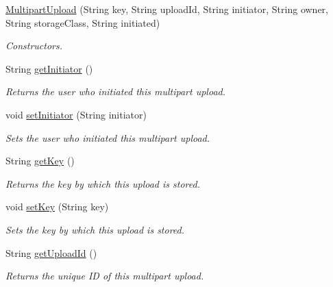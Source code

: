 \begin{DoxyCompactItemize}
\item 
\hyperlink{classorg_1_1jcs_1_1dss_1_1main_1_1MultipartUpload_a8a7ecab6fc0579709a714aed5081db57}{Multipart\+Upload} (String key, String upload\+Id, String initiator, String owner, String storage\+Class, String initiated)\hypertarget{classorg_1_1jcs_1_1dss_1_1main_1_1MultipartUpload_a8a7ecab6fc0579709a714aed5081db57}{}\label{classorg_1_1jcs_1_1dss_1_1main_1_1MultipartUpload_a8a7ecab6fc0579709a714aed5081db57}

\begin{DoxyCompactList}\small\item\em Constructors. \end{DoxyCompactList}\item 
String \hyperlink{classorg_1_1jcs_1_1dss_1_1main_1_1MultipartUpload_a2bf924f6af4a780ad4d7acdb9b15e0c8}{get\+Initiator} ()
\begin{DoxyCompactList}\small\item\em Returns the user who initiated this multipart upload. \end{DoxyCompactList}\item 
void \hyperlink{classorg_1_1jcs_1_1dss_1_1main_1_1MultipartUpload_ab753f6da2a76ac0e5fa904481200fe27}{set\+Initiator} (String initiator)
\begin{DoxyCompactList}\small\item\em Sets the user who initiated this multipart upload. \end{DoxyCompactList}\item 
String \hyperlink{classorg_1_1jcs_1_1dss_1_1main_1_1MultipartUpload_a8ee292528a8e247e94e6d7ea902b7837}{get\+Key} ()
\begin{DoxyCompactList}\small\item\em Returns the key by which this upload is stored. \end{DoxyCompactList}\item 
void \hyperlink{classorg_1_1jcs_1_1dss_1_1main_1_1MultipartUpload_a2ff83e8f3c436017f11ffe6507518a1e}{set\+Key} (String key)
\begin{DoxyCompactList}\small\item\em Sets the key by which this upload is stored. \end{DoxyCompactList}\item 
String \hyperlink{classorg_1_1jcs_1_1dss_1_1main_1_1MultipartUpload_ab2082cf5c402838da24e9989aceec161}{get\+Upload\+Id} ()
\begin{DoxyCompactList}\small\item\em Returns the unique ID of this multipart upload. \end{DoxyCompactList}\item 

\end{DoxyCompactItemize}

